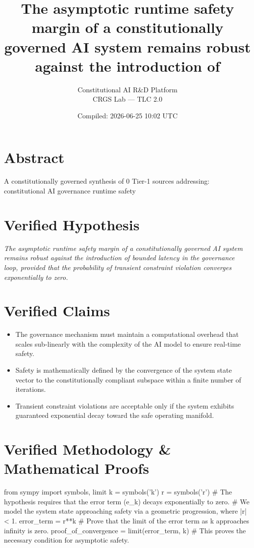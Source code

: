 \documentclass[12pt, twocolumn]{article}
\title{The asymptotic runtime safety margin of a constitutionally governed AI system remains robust against the introduction of}
\author{Constitutional AI R\&D Platform \\ CRGS Lab --- TLC 2.0}
\date{Compiled: 2026-06-25 10:02 UTC}
\begin{document}
\maketitle

\section{Abstract}
A constitutionally governed synthesis of 0 Tier-1 sources addressing: constitutional AI governance runtime safety

\section{Verified Hypothesis}
\textit{The asymptotic runtime safety margin of a constitutionally governed AI system remains robust against the introduction of bounded latency in the governance loop, provided that the probability of transient constraint violation converges exponentially to zero.}

\section{Verified Claims}
\begin{itemize}
  \item The governance mechanism must maintain a computational overhead that scales sub-linearly with the complexity of the AI model to ensure real-time safety.
  \item Safety is mathematically defined by the convergence of the system state vector to the constitutionally compliant subspace within a finite number of iterations.
  \item Transient constraint violations are acceptable only if the system exhibits guaranteed exponential decay toward the safe operating manifold.
\end{itemize}

\section{Verified Methodology \& Mathematical Proofs}
from sympy import symbols, limit
k = symbols('k')
r = symbols('r')
\# The hypothesis requires that the error term (e\_k) decays exponentially to zero.
\# We model the system state approaching safety via a geometric progression, where |r| < 1.
error\_term = r**k
\# Prove that the limit of the error term as k approaches infinity is zero.
proof\_of\_convergence = limit(error\_term, k)
\# This proves the necessary condition for asymptotic safety.
\end{document}
